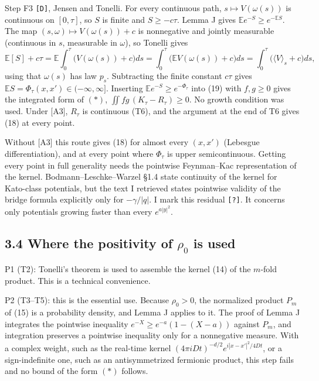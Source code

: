\documentclass[11pt,a4paper]{article}
\begin{document}
Step F3 \texttt{[D]}, Jensen and Tonelli. For every continuous path, \(s\mapsto V(\omega(s))\) is continuous on \([0,\tau]\), so \(S\) is finite and \(S\ge-c\tau\). Lemma J gives \(\mathbb E e^{-S}\ge e^{-\mathbb E S}\). The map \((s,\omega)\mapsto V(\omega(s))+c\) is nonnegative and jointly measurable (continuous in \(s\), measurable in \(\omega\)), so Tonelli gives
\[\mathbb E[S]+c\tau=\mathbb E\int_0^\tau\big(V(\omega(s))+c\big)ds=\int_0^\tau\big(\mathbb E V(\omega(s))+c\big)ds=\int_0^\tau\big(\langle V\rangle_s+c\big)ds,\tag{20}\]
using that \(\omega(s)\) has law \(p_s\). Subtracting the finite constant \(c\tau\) gives \(\mathbb E S=\Phi_\tau(x,x')\in(-\infty,\infty]\). Inserting \(\mathbb E e^{-S}\ge e^{-\Phi_\tau}\) into (19) with \(f,g\ge0\) gives the integrated form of \((\ast)\), \(\iint fg\,(K_\tau-R_\tau)\ge0\). No growth condition was used. Under {[}A3{]}, \(R_\tau\) is continuous (T6), and the argument at the end of T6 gives (18) at every point.

Without {[}A3{]} this route gives (18) for almost every \((x,x')\) (Lebesgue differentiation), and at every point where \(\Phi_\tau\) is upper semicontinuous. Getting every point in full generality needs the pointwise Feynman--Kac representation of the kernel. Bodmann--Leschke--Warzel §1.4 state continuity of the kernel for Kato-class potentials, but the text I retrieved states pointwise validity of the bridge formula explicitly only for \(-\gamma/|q|\). I mark this residual \texttt{[?]}. It concerns only potentials growing faster than every \(e^{a|y|^2}\).

\hypertarget{where-the-positivity-of-rho_0-is-used}{%
\subsection{\texorpdfstring{3.4 Where the positivity of \(\rho_0\) is used}{3.4 Where the positivity of \textbackslash rho\_0 is used}}\label{where-the-positivity-of-rho_0-is-used}}

P1 (T2): Tonelli's theorem is used to assemble the kernel (14) of the \(m\)-fold product. This is a technical convenience.

P2 (T3--T5): this is the essential use. Because \(\rho_0>0\), the normalized product \(P_m\) of (15) is a probability density, and Lemma J applies to it. The proof of Lemma J integrates the pointwise inequality \(e^{-X}\ge e^{-a}(1-(X-a))\) against \(P_m\), and integration preserves a pointwise inequality only for a nonnegative measure. With a complex weight, such as the real-time kernel \((4\pi iDt)^{-d/2}e^{i|x-x'|^2/4Dt}\), or a sign-indefinite one, such as an antisymmetrized fermionic product, this step fails and no bound of the form \((\ast)\) follows.
\end{document}
